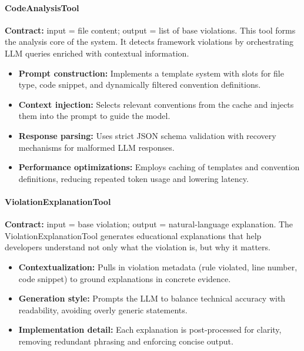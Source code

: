 \begin{spacing}{1.2}
\paragraph{CodeAnalysisTool}
\textbf{Contract:} input = file content; output = list of base violations.  
This tool forms the analysis core of the system. It detects framework violations by orchestrating LLM queries enriched with contextual information.
\begin{itemize}
    \item \textbf{Prompt construction:} Implements a template system with slots for file type, code snippet, and dynamically filtered convention definitions.
    \item \textbf{Context injection:} Selects relevant conventions from the cache and injects them into the prompt to guide the model.
    \item \textbf{Response parsing:} Uses strict JSON schema validation with recovery mechanisms for malformed LLM responses.
    \item \textbf{Performance optimizations:} Employs caching of templates and convention definitions, reducing repeated token usage and lowering latency.
\end{itemize}

\paragraph{ViolationExplanationTool}
\textbf{Contract:} input = base violation; output = natural-language explanation.  
The ViolationExplanationTool generates educational explanations that help developers understand not only what the violation is, but why it matters.
\begin{itemize}
    \item \textbf{Contextualization:} Pulls in violation metadata (rule violated, line number, code snippet) to ground explanations in concrete evidence.
    \item \textbf{Generation style:} Prompts the LLM to balance technical accuracy with readability, avoiding overly generic statements.
    \item \textbf{Implementation detail:} Each explanation is post-processed for clarity, removing redundant phrasing and enforcing concise output.
\end{itemize}


\end{spacing}
